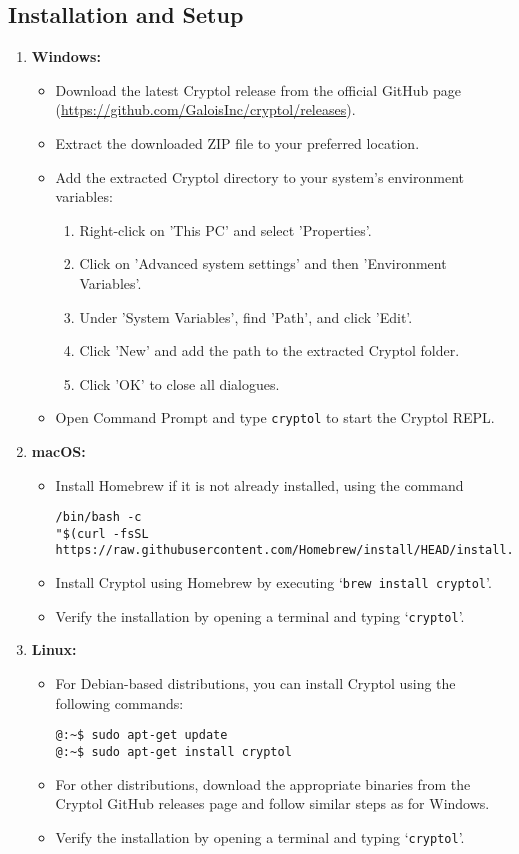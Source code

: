 \subsection{Installation and Setup}
\begin{enumerate}
\item \textbf{Windows:}
\begin{itemize}
	\item Download the latest Cryptol release from the official GitHub page \\
	(\url{https://github.com/GaloisInc/cryptol/releases}).
	\item Extract the downloaded ZIP file to your preferred location.
	\item Add the extracted Cryptol directory to your system's environment variables:
	\begin{enumerate}
		\item Right-click on 'This PC' and select 'Properties'.
		\item Click on 'Advanced system settings' and then 'Environment Variables'.
		\item Under 'System Variables', find 'Path', and click 'Edit'.
		\item Click 'New' and add the path to the extracted Cryptol folder.
		\item Click 'OK' to close all dialogues.
	\end{enumerate}
	\item Open Command Prompt and type \texttt{cryptol} to start the Cryptol REPL.
\end{itemize}
\item \textbf{macOS:}
\begin{itemize}
\item Install Homebrew if it is not already installed, using the command
\begin{lstlisting}[style=zsh]
/bin/bash -c
"$(curl -fsSL https://raw.githubusercontent.com/Homebrew/install/HEAD/install.sh)"
\end{lstlisting}
\item Install Cryptol using Homebrew by executing `\texttt{brew install cryptol}'.
\item Verify the installation by opening a terminal and typing `\texttt{cryptol}'.
\end{itemize}
\item \textbf{Linux:}
\begin{itemize}
\item For Debian-based distributions, you can install Cryptol using the following commands:
\begin{lstlisting}[style=zsh]
@:~$ sudo apt-get update
@:~$ sudo apt-get install cryptol
\end{lstlisting}
\item For other distributions, download the appropriate binaries from the Cryptol GitHub releases page and follow similar steps as for Windows.
\item Verify the installation by opening a terminal and typing `\texttt{cryptol}'.
\end{itemize}
\end{enumerate}
